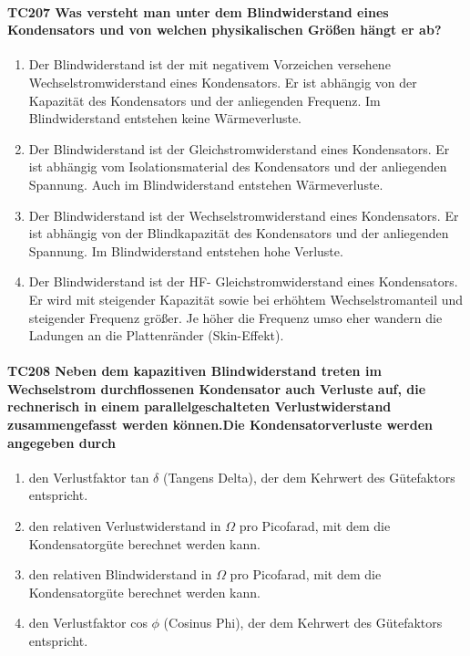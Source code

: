 \documentclass[8pt]{article}
\begin{document}
\begin{enumerate}
\begin{enumerate}[nolistsep,label=\Alph*]
{\paragraph*{TC207 Was versteht man unter dem Blindwiderstand eines Kondensators und von welchen physikalischen Größen hängt er ab?}
\begin{enumerate}[nolistsep,label=\Alph*]
\item Der Blindwiderstand ist der mit negativem Vorzeichen versehene Wechselstromwiderstand eines Kondensators. Er ist abhängig von der Kapazität des Kondensators und der anliegenden Frequenz. Im Blindwiderstand entstehen keine Wärmeverluste.
\item Der Blindwiderstand ist der Gleichstromwiderstand eines Kondensators. Er ist abhängig vom Isolationsmaterial des Kondensators und der anliegenden Spannung. Auch im Blindwiderstand entstehen Wärmeverluste.
\item Der Blindwiderstand ist der Wechselstromwiderstand eines Kondensators. Er ist abhängig von der Blindkapazität des Kondensators und der anliegenden Spannung. Im Blindwiderstand entstehen hohe Verluste.
\item Der Blindwiderstand ist der HF- Gleichstromwiderstand eines Kondensators. Er wird mit steigender Kapazität sowie bei erhöhtem Wechselstromanteil und steigender Frequenz größer. Je höher die Frequenz umso eher wandern die Ladungen an die Plattenränder (Skin-Effekt). 
\end{enumerate}

\paragraph*{TC208 Neben dem kapazitiven Blindwiderstand treten im Wechselstrom durchflossenen Kondensator auch Verluste auf, die rechnerisch in einem parallelgeschalteten Verlustwiderstand zusammengefasst werden können.Die Kondensatorverluste werden angegeben durch}
\begin{enumerate}[nolistsep,label=\Alph*]
\item den Verlustfaktor tan $\delta$ (Tangens Delta), der dem Kehrwert des Gütefaktors entspricht.
\item den relativen Verlustwiderstand in $\Omega$ pro Picofarad, mit dem die Kondensatorgüte berechnet werden kann.
\item den relativen Blindwiderstand in $\Omega$ pro Picofarad, mit dem die Kondensatorgüte berechnet werden kann.
\item den Verlustfaktor cos $\phi$ (Cosinus Phi), der dem Kehrwert des Gütefaktors entspricht.
\end{enumerate}

}
\end{enumerate}
\end{enumerate}
\end{document}
